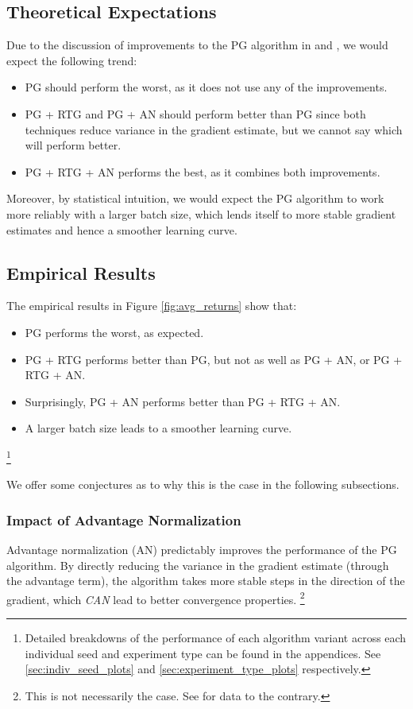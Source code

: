 \documentclass{article} %
\begin{document}
\subsection{Theoretical Expectations}
Due to the discussion of improvements to the PG algorithm in \cite{Levine-et-al-2023} and \cite{Week2},
we would expect the following trend:
\begin{itemize}
    \item PG should perform the worst, as it does not use any of the improvements.
    \item PG + RTG and PG + AN should perform better than PG since both techniques
    reduce variance in the gradient estimate, but we cannot say which will perform better.
    \item PG + RTG + AN performs the best, as it combines both improvements.
\end{itemize}

Moreover, by statistical intuition, we would expect the PG algorithm to work more reliably with a larger batch size,
which lends itself to more stable gradient estimates and hence a smoother learning curve.

\subsection{Empirical Results}
The empirical results in Figure \ref{fig:avg_returns} show that:
\begin{itemize}
    \item PG performs the worst, as expected.
    \item PG + RTG performs better than PG, but not as well as PG + AN, or PG + RTG + AN.
    \item Surprisingly, PG + AN performs better than PG + RTG + AN.
    \item A larger batch size leads to a smoother learning curve.
\end{itemize}
\footnote{
    Detailed breakdowns of the performance of each algorithm variant
    across each individual seed and experiment type can be found in the appendices.
    See \ref{sec:indiv_seed_plots} and \ref{sec:experiment_type_plots} respectively.
}

We offer some conjectures as to why this is the case in the following subsections.

\subsubsection{Impact of Advantage Normalization}
Advantage normalization (AN) predictably improves the performance of the PG algorithm.
By directly reducing the variance in the gradient estimate (through the advantage term),
the algorithm takes more stable steps in the direction of the gradient,
which \textit{CAN} lead to better convergence properties. 
\footnote{This is not necessarily the case. See \cite{Andrychowicz-et-al-2020} 
for data to the contrary.}
\end{document}
